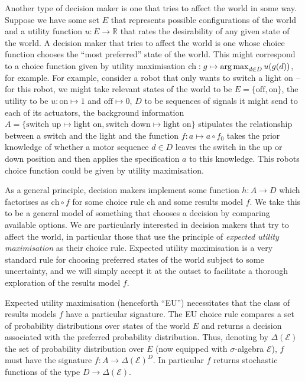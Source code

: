 Another type of decision maker is one that tries to affect the world in some way. Suppose we have some set $E$ that represents possible configurations of the world and a utility function $u:E\to \mathbb{R}$ that rates the desirability of any given state of the world. A decision maker that tries to affect the world is one whose choice function chooses the ``most preferred'' state of the world. This might correspond to a choice function given by utility maximisation $\mathrm{ch}:g\mapsto \operatorname*{arg\,max}_{d\in D}u(g(d))$, for example. For example, consider a robot that only wants to switch a light on -- for this robot, we might take relevant states of the world to be $E=\{\mathrm{off},\mathrm{on}\}$, the utility to be $u:\mathrm{on}\mapsto 1$ and $\mathrm{off}\mapsto 0$, $D$ to be sequences of signals it might send to each of its actuators, the background information $A=\{\text{switch up}\mapsto\text{light on},\text{switch down}\mapsto \text{light on}\}$ stipulates the relationship between a switch and the light and the function $f:a\mapsto a\circ f_0$ takes the prior knowledge of whether a motor sequence $d\in D$ leaves the switch in the up or down position and then applies the specification $a$ to this knowledge. This robots choice function could be given by utility maximisation.

As a general principle, decision makers implement some function $h:A\to D$ which factorises as $\mathrm{ch}\circ f$ for some choice rule $\mathrm{ch}$ and some results model $f$. We take this to be a general model of something that chooses a decision by comparing available options. We are particularly interested in decision makers that try to affect the world, in particular those that use the principle of \emph{expected utility maximisation} as their choice rule. Expected utility maximisation is a very standard rule for choosing preferred states of the world subject to some uncertainty, and we will simply accept it at the outset to facilitate a thorough exploration of the results model $f$.

Expected utility maximisation (henceforth ``EU'') necessitates that the class of results models $f$ have a particular signature. The EU choice rule compares a set of probability distributions over states of the world $E$ and returns a decision associated with the preferred probability distribution. Thus, denoting by $\Delta(\mathcal{E})$ the set of probability distribution over $E$ (now equipped with $\sigma$-algebra $\mathcal{E}$), $f$ must have the signature $f:A\to \Delta(\mathcal{E})^D$. In particular $f$ returns stochastic functions of the type $D\to \Delta(\mathcal{E})$.

